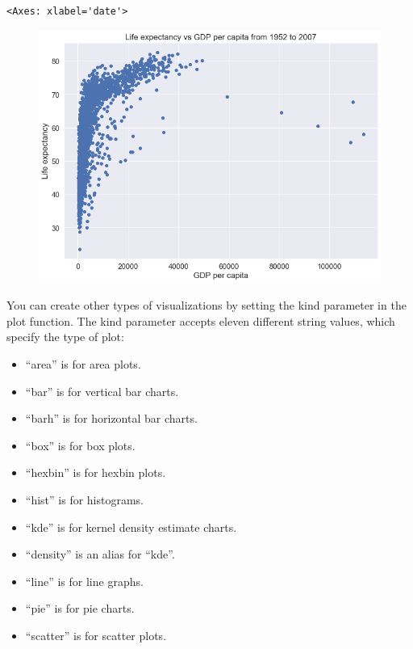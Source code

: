 \documentclass[
  letterpaper,
  DIV=11,
  numbers=noendperiod]{scrreprt}
\providecommand{\tightlist}{%
  \setlength{\itemsep}{0pt}\setlength{\parskip}{0pt}}\usepackage{longtable,booktabs,array}
\begin{document}
\begin{verbatim}
<Axes: xlabel='date'>
\end{verbatim}

\begin{figure}[H]

{\centering \includegraphics{Data visualization_files/figure-pdf/cell-9-output-2.png}

}

\end{figure}

You can create other types of visualizations by setting the kind
parameter in the plot function. The kind parameter accepts eleven
different string values, which specify the type of plot:

\begin{itemize}
\tightlist
\item
  ``area'' is for area plots.
\item
  ``bar'' is for vertical bar charts.
\item
  ``barh'' is for horizontal bar charts.
\item
  ``box'' is for box plots.
\item
  ``hexbin'' is for hexbin plots.
\item
  ``hist'' is for histograms.
\item
  ``kde'' is for kernel density estimate charts.
\item
  ``density'' is an alias for ``kde''.
\item
  ``line'' is for line graphs.
\item
  ``pie'' is for pie charts.
\item
  ``scatter'' is for scatter plots.
\end{itemize}
\end{document}
